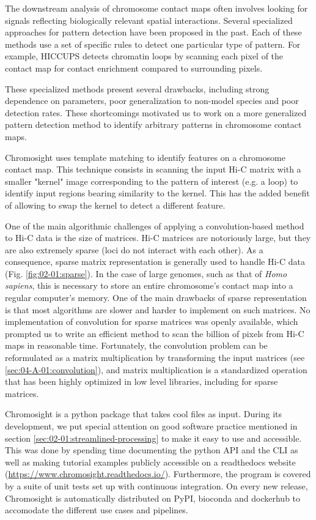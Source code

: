 The downstream analysis of chromosome contact maps often involves looking for signals reflecting biologically relevant spatial interactions. Several specialized approaches for pattern detection have been proposed in the past. Each of these methods use a set of specific rules to detect one particular type of pattern. For example, HICCUPS \cite{rao3DMapHuman2014} detects chromatin loops by scanning each pixel of the contact map for contact enrichment compared to surrounding pixels.

These specialized methods present several drawbacks, including strong dependence on parameters, poor generalization to non-model species and poor detection rates. These shortcomings motivated us to work on a more generalized pattern detection method to identify arbitrary patterns in chromosome contact maps.

Chromosight uses template matching to identify features on a chromosome contact map. This technique consists in scanning the input Hi-C matrix with a smaller "kernel" image corresponding to the pattern of interest (e.g. a loop) to identify input regions bearing similarity to the kernel. This has the added benefit of allowing to swap the kernel to detect a different feature.

One of the main algorithmic challenges of applying a convolution-based method to Hi-C data is the size of matrices. Hi-C matrices are notoriously large, but they are also extremely sparse (loci do not interact with each other). As a consequence, sparse matrix representation is generally used to handle Hi-C data (Fig. \ref{fig:02-01:sparse}). In the case of large genomes, such as that of \textit{Homo sapiens}, this is necessary to store an entire chromosome's contact map into a regular computer's memory. One of the main drawbacks of sparse representation is that most algorithms are slower and harder to implement on such matrices. No implementation of convolution for sparse matrices was openly available, which prompted us to write an efficient method to scan the billion of pixels from Hi-C maps in reasonable time. Fortunately, the convolution problem can be reformulated as a matrix multiplication by transforming the input matrices (see \ref{sec:04-A-01:convolution}), and matrix multiplication is a standardized operation that has been highly optimized in low level libraries, including for sparse matrices.

Chromosight is a python package that takes cool files as input. During its development, we put special attention on good software practice mentioned in section \ref{sec:02-01:streamlined-processing} to make it easy to use and accessible. This was done by spending time documenting the python \acrshort{API} and the \acrshort{CLI} as well as making tutorial examples publicly accessible on a readthedocs website (\url{https://www.chromosight.readthedocs.io/}). Furthermore, the program is covered by a suite of unit tests set up with continuous integration. On every new release, Chromosight is automatically distributed on PyPI, bioconda and dockerhub to accomodate the different use cases and pipelines.

